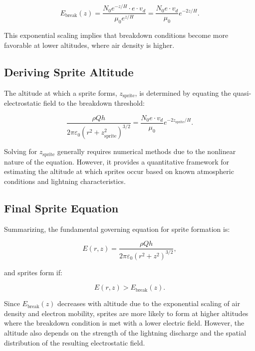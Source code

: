 \documentclass[a4paper,10pt]{article}
\begin{document}
\begin{equation*}
E_\text{break}(z) = \frac{N_0 e^{-z/H} \cdot e \cdot v_d}{\mu_0 e^{z/H}} = \frac{N_0 e \cdot v_d}{\mu_0} e^{-2z/H}.
\end{equation*}


This exponential scaling implies that breakdown conditions become more favorable at lower altitudes, where air density is higher.


\subsection*{Deriving Sprite Altitude}
The altitude at which a sprite forms, $z_\text{sprite}$, is determined by equating the quasi-electrostatic field to the breakdown threshold:


\begin{equation*}
\frac{\rho Q h}{2 \pi \varepsilon_0 (r^2 + z_\text{sprite}^2)^{3/2}} = \frac{N_0 e \cdot v_d}{\mu_0} e^{-2z_\text{sprite}/H}.
\end{equation*}


Solving for $z_\text{sprite}$ generally requires numerical methods due to the nonlinear nature of the equation. However, it provides a quantitative framework for estimating the altitude at which sprites occur based on known atmospheric conditions and lightning characteristics.


\subsection*{Final Sprite Equation}
Summarizing, the fundamental governing equation for sprite formation is:


\begin{equation*}
E(r, z) = \frac{\rho Q h}{2 \pi \varepsilon_0 (r^2 + z^2)^{3/2}},
\end{equation*}


and sprites form if:


\begin{equation*}
E(r, z) > E_\text{break}(z).
\end{equation*}


Since $E_\text{break}(z)$ decreases with altitude due to the exponential scaling of air density and electron mobility, sprites are more likely to form at higher altitudes where the breakdown condition is met with a lower electric field. However, the altitude also depends on the strength of the lightning discharge and the spatial distribution of the resulting electrostatic field.
\end{document}
